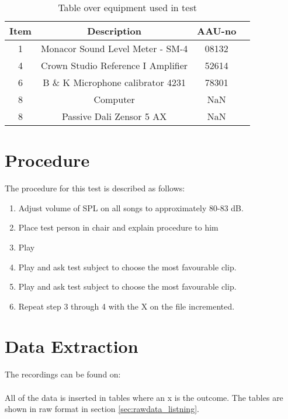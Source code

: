 \begin{table}[H]
\centering
{}
\begin{tabular}{S[table-format=1]ccc} \toprule
    {Item} & {Description} & {AAU-no} \\       &  Monacor Sound Level Meter - SM-4      & 08132   \\
    4      &  Crown Studio Reference I Amplifier    & 52614   \\
    6      &  B \& K Microphone calibrator 4231     & 78301   \\
    8      &  Computer                              & NaN     \\  
    8      &  Passive Dali Zensor 5 AX              & NaN     \\ \bottomrule 
\end{tabular}
\caption{Table over equipment used in test}
\label{tab:UsedEquipmentListning}
\end{table}



\section{Procedure}\label{sec:SpeakerTestProcedure3}

The procedure for this test is described as follows:
\vspace*{-5mm}
\begin{enumerate}\addtolength{\itemsep}{-.35\baselineskip} 
\item Adjust volume of \gls{SPL} on all songs to approximately 80-83 dB.
\item Place test person in chair and explain procedure to him
\item Play 
\item Play  and ask test subject to choose the most favourable clip.
\item Play  and ask test subject to choose the most favourable clip.
\item Repeat step 3 through 4 with the X on the file incremented.
\end{enumerate}

\section{Data Extraction}
The recordings can be found on:\\
\\
All of the data is inserted in tables where an x is the outcome. The tables are shown in raw format in section \ref{sec:rawdata_listning}.



